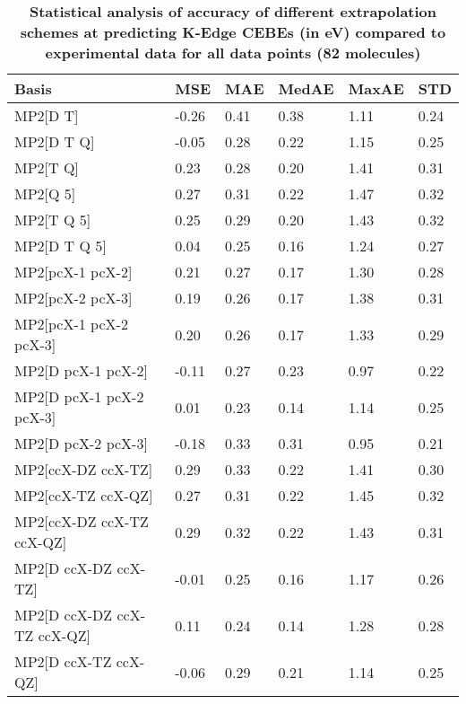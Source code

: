 \begin{table}
  \caption{\textbf{Statistical analysis of accuracy of different extrapolation schemes at predicting K-Edge CEBEs (in eV) compared to experimental data for all data points (82 molecules)}}
  \begin{tabular}{l l l l l l }
    \toprule
    \textbf{Basis} & \textbf{MSE} & \textbf{MAE} & \textbf{MedAE} & \textbf{MaxAE} & \textbf{STD} \\ 
    \midrule
    MP2[D T] & -0.26 & 0.41 & 0.38 & 1.11 & 0.24 \\ 
    MP2[D T Q] & -0.05 & 0.28 & 0.22 & 1.15 & 0.25 \\ 
    MP2[T Q] & 0.23 & 0.28 & 0.20 & 1.41 & 0.31 \\ 
    MP2[Q 5] & 0.27 & 0.31 & 0.22 & 1.47 & 0.32 \\ 
    MP2[T Q 5] & 0.25 & 0.29 & 0.20 & 1.43 & 0.32 \\ 
    MP2[D T Q 5] & 0.04 & 0.25 & 0.16 & 1.24 & 0.27 \\ 
    MP2[pcX-1 pcX-2] & 0.21 & 0.27 & 0.17 & 1.30 & 0.28 \\ 
    MP2[pcX-2 pcX-3] & 0.19 & 0.26 & 0.17 & 1.38 & 0.31 \\ 
    MP2[pcX-1 pcX-2 pcX-3] & 0.20 & 0.26 & 0.17 & 1.33 & 0.29 \\ 
    MP2[D pcX-1 pcX-2] & -0.11 & 0.27 & 0.23 & 0.97 & 0.22 \\ 
    MP2[D pcX-1 pcX-2 pcX-3] & 0.01 & 0.23 & 0.14 & 1.14 & 0.25 \\ 
    MP2[D pcX-2 pcX-3] & -0.18 & 0.33 & 0.31 & 0.95 & 0.21 \\ 
    MP2[ccX-DZ ccX-TZ] & 0.29 & 0.33 & 0.22 & 1.41 & 0.30 \\ 
    MP2[ccX-TZ ccX-QZ] & 0.27 & 0.31 & 0.22 & 1.45 & 0.32 \\ 
    MP2[ccX-DZ ccX-TZ ccX-QZ] & 0.29 & 0.32 & 0.22 & 1.43 & 0.31 \\ 
    MP2[D ccX-DZ ccX-TZ] & -0.01 & 0.25 & 0.16 & 1.17 & 0.26 \\ 
    MP2[D ccX-DZ ccX-TZ ccX-QZ] & 0.11 & 0.24 & 0.14 & 1.28 & 0.28 \\ 
    MP2[D ccX-TZ ccX-QZ] & -0.06 & 0.29 & 0.21 & 1.14 & 0.25 \\ 
    \bottomrule
  \end{tabular}
\end{table}

